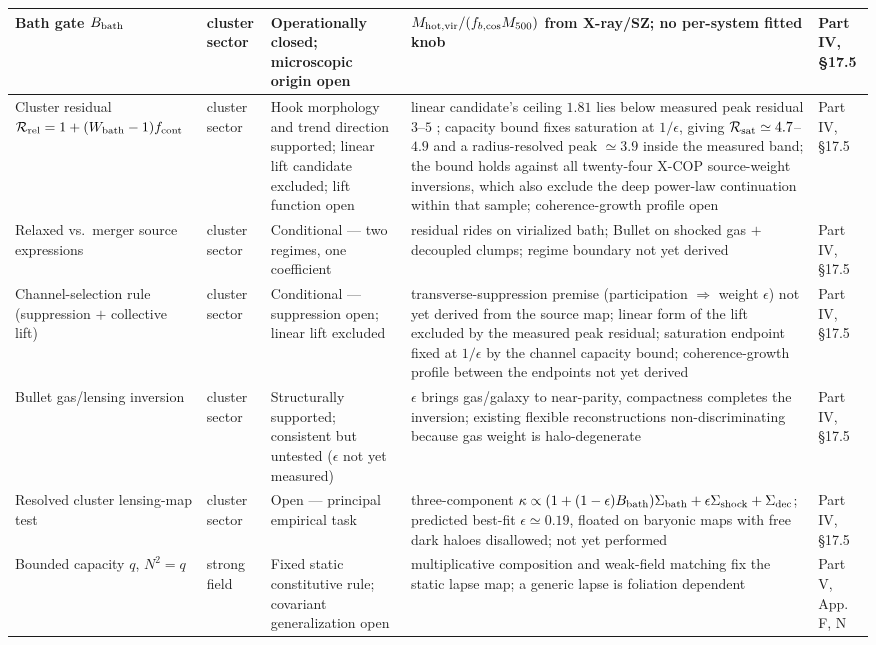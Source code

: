 \documentclass[11pt]{article}
\begin{document}
\begin{longtable}{|L{0.18\textwidth}|L{0.13\textwidth}|L{0.16\textwidth}|L{0.33\textwidth}|L{0.13\textwidth}|}
\hline
Bath gate $B_{\rm bath}$ & cluster sector & Operationally closed; microscopic origin open & $M_{\rm hot,vir}/(f_{b,\rm cos}M_{500})$ from X-ray/SZ; no per-system fitted knob & Part IV, \S17.5 \\
\hline
Cluster residual $\mathcal R_{\rm rel}=1+(W_{\rm bath}-1)f_{\rm cont}$ & cluster sector & Hook morphology and trend direction supported; linear lift candidate excluded; lift function open & linear candidate's ceiling $1.81$ lies below measured peak residual $3$--$5$ \citep{Tian2020,Eckert2022,Li2023}; capacity bound fixes saturation at $1/\epsilon$, giving $\mathcal R_{\rm sat}\simeq4.7$--$4.9$ and a radius-resolved peak $\simeq3.9$ inside the measured band; the bound holds against all twenty-four X-COP source-weight inversions, which also exclude the deep power-law continuation within that sample; coherence-growth profile open & Part IV, \S17.5 \\
\hline
Relaxed vs.\ merger source expressions & cluster sector & Conditional --- two regimes, one coefficient & residual rides on virialized bath; Bullet on shocked gas $+$ decoupled clumps; regime boundary not yet derived & Part IV, \S17.5 \\
\hline
Channel-selection rule (suppression $+$ collective lift) & cluster sector & Conditional --- suppression open; linear lift excluded & transverse-suppression premise (participation $\Rightarrow$ weight $\epsilon$) not yet derived from the source map; linear form of the lift excluded by the measured peak residual; saturation endpoint fixed at $1/\epsilon$ by the channel capacity bound; coherence-growth profile between the endpoints not yet derived & Part IV, \S17.5 \\
\hline
Bullet gas/lensing inversion & cluster sector & Structurally supported; consistent but untested ($\epsilon$ not yet measured) & $\epsilon$ brings gas/galaxy to near-parity, compactness completes the inversion; existing flexible reconstructions non-discriminating because gas weight is halo-degenerate & Part IV, \S17.5 \\
\hline
Resolved cluster lensing-map test & cluster sector & Open --- principal empirical task & three-component $\kappa\propto(1+(1-\epsilon)B_{\rm bath})\Sigma_{\rm bath}+\epsilon\Sigma_{\rm shock}+\Sigma_{\rm dec}$; predicted best-fit $\epsilon\simeq0.19$, floated on baryonic maps with free dark haloes disallowed; not yet performed & Part IV, \S17.5 \\
\hline
Bounded capacity $q$, $N^2=q$ & strong field & Fixed static constitutive rule; covariant generalization open & multiplicative composition and weak-field matching fix the static lapse map; a generic lapse is foliation dependent & Part V, App. F, N \\

\end{longtable}
\end{document}
